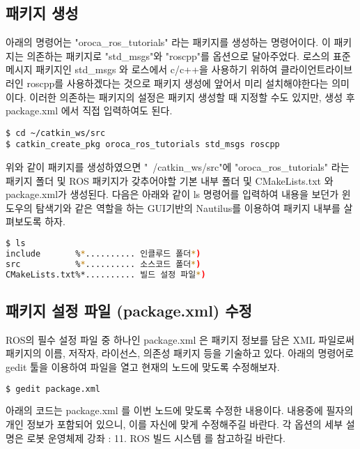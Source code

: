 \subsection{패키지 생성}

아래의 명령어는 "oroca\_ros\_tutorials" 라는 패키지를 생성하는 명령어이다. 이 패키지는 의존하는 패키지로 "std\_msgs"와 "roscpp"를 옵션으로 달아주었다. 로스의 표준 메시지 패키지인 std\_msgs 와 로스에서 c/c++을 사용하기 위하여 클라이언트라이브러인 roscpp를 사용하겠다는 것으로 패키지 생성에 앞어서 미리 설치해야한다는 의미이다. 이러한 의존하는 패키지의 설정은 패키지 생성할 때 지정할 수도 있지만, 생성 후 package.xml 에서 직접 입력하여도 된다.

\begin{lstlisting}[language=ROS]
$ cd ~/catkin_ws/src
$ catkin_create_pkg oroca_ros_tutorials std_msgs roscpp
\end{lstlisting}

위와 같이 패키지를 생성하였으면 "~/catkin\_ws/src"에 "oroca\_ros\_tutorials" 라는 패키지 폴더 및 ROS 패키지가 갖추어야할 기본 내부 폴더 및 CMakeLists.txt 와 package.xml가 생성된다. 다음은 아래와 같이 ls 명령어를 입력하여 내용을 보던가 윈도우의 탐색기와 같은 역할을 하는 GUI기반의 Nautilus를 이용하여 패키지 내부를 살펴보도록 하자.

\begin{lstlisting}[language=bash]
$ ls
include       %*.......... 인클루드 폴더*)
src           %*.......... 소스코드 폴더*)
CMakeLists.txt%*.......... 빌드 설정 파일*)
\end{lstlisting}

\subsection{패키지 설정 파일 (package.xml) 수정}

ROS의 필수 설정 파일 중 하나인 package.xml 은 패키지 정보를 담은 XML 파일로써 패키지의 이름, 저작자, 라이선스, 의존성 패키지 등을 기술하고 있다. 아래의 명령어로 gedit 툴을 이용하여 파일을 열고 현재의 노드에 맞도록 수정해보자.

\begin{lstlisting}[language=bash]
$ gedit package.xml 
\end{lstlisting}

아래의 코드는 package.xml 를 이번 노드에 맞도록 수정한 내용이다. 내용중에 필자의 개인 정보가 포함되어 있으니, 이를 자신에 맞게 수정해주길 바란다. 각 옵션의 세부 설명은 로봇 운영체제 강좌 : 11. ROS 빌드 시스템 를 참고하길 바란다.

